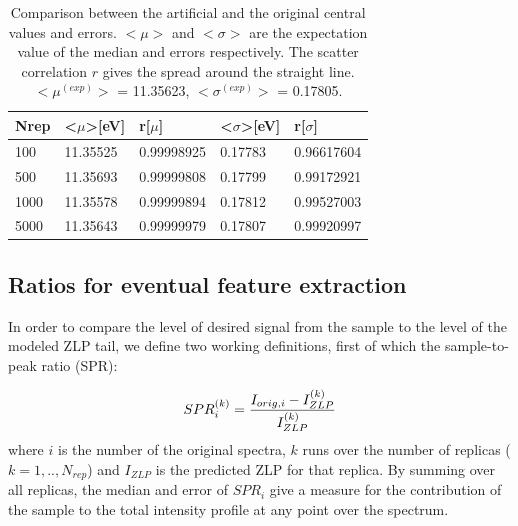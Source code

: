 \documentclass[11pt,a4paper]{article}
\def\frac#1#2{{{#1}\over {#2}}}
\numberwithin{equation}{section}
\numberwithin{figure}{section}
\numberwithin{table}{section}
\begin{document}
\begin{table}[H]
\centering
\begin{tabular}{|l|ll|ll|}
\hline
Nrep & \textless{}$\mu$\textgreater {[}eV{]} & r{[}$\mu${]} & \textless{}$\sigma$\textgreater {[}eV{]} & r{[}$\sigma${]} \\ \hline
100  & 11.35525                              & 0.99998925   & 0.17783                                  & 0.96617604      \\ \hline
500  & 11.35693                              & 0.99999808   & 0.17799                                  & 0.99172921      \\ \hline
1000 & 11.35578                              & 0.99999894   & 0.17812                                  & 0.99527003      \\ \hline
5000 & 11.35643                              & 0.99999979   & 0.17807                                  & 0.99920997      \\ \hline
\end{tabular}
\caption{Comparison between the artificial and the original central values and errors. $<\mu>$ and $<\sigma>$ are the expectation value of the median and errors respectively. The scatter correlation $r$ gives the spread around the straight line. $<\mu^{(exp)}>$ = 11.35623, $<\sigma^{(exp)}>$ = 0.17805. }
\label{tablemc}
\end{table}

\subsection{Ratios for eventual feature extraction}

In order to compare the level of desired signal from the sample to the level of the modeled ZLP tail, we define two working definitions, first of which the sample-to-peak ratio (SPR):

\begin{equation}
    SPR_{i}^{(k)} = \frac{I_{orig, i} - I_{ZLP}^{(k)}}{I_{ZLP}^{(k)}}
\end{equation}
where $i$ is the number of the original spectra, $k$ runs over the number of replicas ($k=1,..,N_{rep}$) and $I_{ZLP}$ is the predicted ZLP for that replica. By summing over all replicas, the median and error of $SPR_i$ give a measure for the contribution of the sample to the total intensity profile at any point over the spectrum. \\
\end{document}
